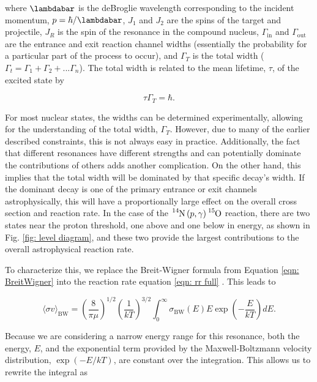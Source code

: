 where $\lambdabar$ is the deBroglie wavelength corresponding to the incident momentum, $p=\hbar/\lambdabar$, $J_1$ and $J_2$ are the spins of the target and projectile, $J_R$ is the spin of the resonance in the compound nucleus, $\Gamma_\mathrm{in}$ and $\Gamma_\mathrm{out}$ are the entrance and exit reaction channel widths (essentially the probability for a particular part of the process to occur), and $\Gamma_T$ is the total width ($\Gamma_t = \Gamma_1 + \Gamma_2 + ... \Gamma_n$). The total width is related to the mean lifetime, $\tau$, of the excited state by 

\begin{equation}
\tau \Gamma_{T} = \hbar.
\label{eqn: width to lifetime}
\end{equation}

For most nuclear states, the widths can be determined experimentally, allowing for the understanding of the total width, $\Gamma_{T}$. However, due to many of the earlier described constraints, this is not always easy in practice. Additionally, the fact that different resonances have different strengths and can potentially dominate the contributions of others adds another complication. On the other hand, this implies that the total width will be dominated by that specific decay's width. If the dominant decay is one of the primary entrance or exit channels astrophysically, this will have a proportionally large effect on the overall cross section and reaction rate. In the case of the $\ce{^{14}N} \left( p, \gamma \right) \ce{^{15}O}$ reaction, there are two states near the proton threshold, one above and one below in energy, as shown in Fig. \ref{fig: level diagram}, and these two provide the largest contributions to the overall astrophysical reaction rate.

To characterize this, we replace the Breit-Wigner formula from Equation \ref{eqn: BreitWigner} into the reaction rate equation \ref{eqn: rr full} \cite{IliadisBook}. This leads to 

\begin{equation}
\langle \sigma v \rangle_{\text{BW}} = \left( \frac{8}{\pi \mu} \right) ^{1/2} \left( \frac{1}{kT} \right) ^{3/2} \int_{0}^{\infty} \sigma_{\text{BW} }(E) E \exp \left(-\dfrac{E}{kT} \right) dE.
\label{eqn: reaction rate BW}
\end{equation}

\noindent Because we are considering a narrow energy range for this resonance, both the energy, $E$, and the exponential term provided by the Maxwell-Boltzmann velocity distribution, $\exp \left( -E / kT \right)$, are constant over the integration. This allows us to rewrite the integral as

